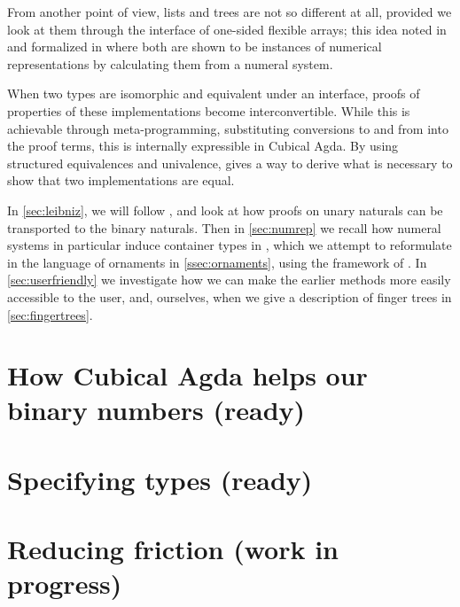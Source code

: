 \documentclass{article}
\theoremstyle{plain}%
\theoremstyle{definition}
\begin{document}
From another point of view, lists and trees are not so different at all, provided we look at them through the interface of one-sided flexible arrays; this idea noted in \cite{purelyfunctional} and formalized in \cite{calcdata} where both are shown to be instances of numerical representations by calculating them from a numeral system. 

When two types are isomorphic and equivalent under an interface, proofs of properties of these implementations become interconvertible. While this is achievable through meta-programming, substituting conversions to and from into the proof terms, this is internally expressible in Cubical Agda. By using structured equivalences and univalence, \cite{iri} gives a way to derive what is necessary to show that two implementations are equal.


In \autoref{sec:leibniz}, we will follow \cite{iri}, and look at how proofs on unary naturals can be transported to the binary naturals. Then in \autoref{sec:numrep} we recall how numeral systems in particular induce container types in \cite{calcdata}, which we attempt to reformulate in the language of ornaments in \autoref{ssec:ornaments}, using the framework of \cite{progorn}. In \autoref{sec:userfriendly} we investigate how we can make the earlier methods more easily accessible to the user, and, ourselves, when we give a description of finger trees in \autoref{sec:fingertrees}.


\section{How Cubical Agda helps our binary numbers (ready)}\label{sec:leibniz}


\section{Specifying types (ready)}\label{sec:numrep}


\section{Reducing friction (work in progress)}\label{sec:userfriendly}

\end{document}
